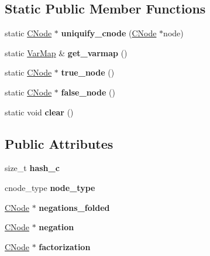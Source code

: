 \subsection*{\-Static \-Public \-Member \-Functions}
\begin{DoxyCompactItemize}
\item 
\hypertarget{classCNode_a586a4efdbfe15ab6140b2a29da4b23a3}{static \hyperlink{classCNode}{\-C\-Node} $\ast$ {\bfseries uniquify\-\_\-cnode} (\hyperlink{classCNode}{\-C\-Node} $\ast$node)}\label{classCNode_a586a4efdbfe15ab6140b2a29da4b23a3}

\item 
\hypertarget{classCNode_a5424ede8b98eed39f3470beb1107ed18}{static \hyperlink{classVarMap}{\-Var\-Map} \& {\bfseries get\-\_\-varmap} ()}\label{classCNode_a5424ede8b98eed39f3470beb1107ed18}

\item 
\hypertarget{classCNode_a7d36f97ba44a57e7e804ce49a14b3db8}{static \hyperlink{classCNode}{\-C\-Node} $\ast$ {\bfseries true\-\_\-node} ()}\label{classCNode_a7d36f97ba44a57e7e804ce49a14b3db8}

\item 
\hypertarget{classCNode_a0baf0dcb51794b19a3a68f943e30b7de}{static \hyperlink{classCNode}{\-C\-Node} $\ast$ {\bfseries false\-\_\-node} ()}\label{classCNode_a0baf0dcb51794b19a3a68f943e30b7de}

\item 
\hypertarget{classCNode_a3b71a2491bfdfa359149afd2561cb71c}{static void {\bfseries clear} ()}\label{classCNode_a3b71a2491bfdfa359149afd2561cb71c}

\end{DoxyCompactItemize}
\subsection*{\-Public \-Attributes}
\begin{DoxyCompactItemize}
\item 
\hypertarget{classCNode_aaee3fb295c130439701174a7515fad65}{size\-\_\-t {\bfseries hash\-\_\-c}}\label{classCNode_aaee3fb295c130439701174a7515fad65}

\item 
\hypertarget{classCNode_aa50d2210f7eee39e9bc7ed2953bec1ca}{cnode\-\_\-type {\bfseries node\-\_\-type}}\label{classCNode_aa50d2210f7eee39e9bc7ed2953bec1ca}

\item 
\hypertarget{classCNode_a411be485406f9bf1246758f5a3c59d69}{\hyperlink{classCNode}{\-C\-Node} $\ast$ {\bfseries negations\-\_\-folded}}\label{classCNode_a411be485406f9bf1246758f5a3c59d69}

\item 
\hypertarget{classCNode_a4cab46ea67148a730497a6b38179360e}{\hyperlink{classCNode}{\-C\-Node} $\ast$ {\bfseries negation}}\label{classCNode_a4cab46ea67148a730497a6b38179360e}

\item 
\hypertarget{classCNode_a5a22b508edc17fb622e0ec4a4118a55a}{\hyperlink{classCNode}{\-C\-Node} $\ast$ {\bfseries factorization}}\label{classCNode_a5a22b508edc17fb622e0ec4a4118a55a}

\end{DoxyCompactItemize}
